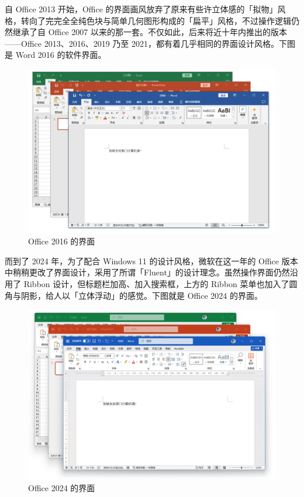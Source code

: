 自 Office 2013 开始，Office 的界面画风放弃了原来有些许立体感的「拟物」风格，转向了完完全全纯色块与简单几何图形构成的「扁平」风格，不过操作逻辑仍然继承了自 Office 2007 以来的那一套。不仅如此，后来将近十年内推出的版本——Office 2013、2016、2019 乃至 2021，都有着几乎相同的界面设计风格。下图是 Word 2016 的软件界面。

\begin{figure}[htb!]
  \centering
  \includegraphics[width=.8\textwidth]{assets/software/Office_2016.png}
  \caption{Office 2016 的界面}
  \label{fig:Office_2016}
\end{figure}

而到了 2024 年，为了配合 Windows 11 的设计风格，微软在这一年的 Office 版本中稍稍更改了界面设计，采用了所谓「Fluent」的设计理念。虽然操作界面仍然沿用了 Ribbon 设计，但标题栏加高、加入搜索框，上方的 Ribbon 菜单也加入了圆角与阴影，给人以「立体浮动」的感觉。下图就是 Office 2024 的界面。

\begin{figure}[htb!]
  \centering
  \includegraphics[width=.8\textwidth]{assets/software/Office_2024.png}
  \caption{Office 2024 的界面}
  \label{fig:Office_2024}
\end{figure}

